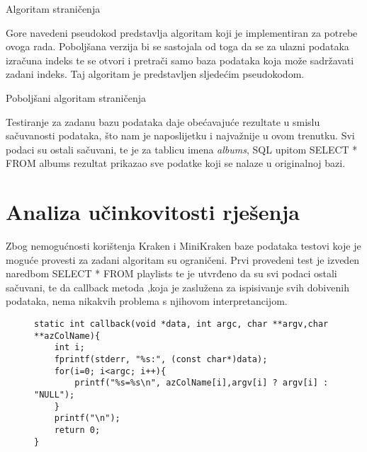 \documentclass[times, utf8, zavrsni]{fer}
\begin{document}
	\begin{algorithm}[H]
		\caption{Algoritam straničenja}
		\label{Stranicenje}
	\end{algorithm}

Gore navedeni pseudokod predstavlja algoritam koji je implementiran za potrebe ovoga rada. Poboljšana verzija bi se sastojala od toga da se za ulazni podataka izračuna indeks te se otvori i pretrači samo baza podataka koja može sadržavati zadani indeks. Taj algoritam je predstavljen sljedećim pseudokodom.
\newline
	\begin{algorithm}[H]
		\caption{Poboljšani algoritam straničenja}
		\label{Stranicenje2}
	\end{algorithm}

Testiranje za zadanu bazu podataka daje obećavajuće rezultate u smislu sačuvanosti podataka, što nam je naposlijetku i najvažnije u ovom trenutku. Svi podaci su ostali sačuvani, te je za tablicu imena \textit{albums}, SQL upitom SELECT * FROM albums rezultat prikazao sve podatke koji se nalaze u originalnoj bazi.
\chapter{Analiza učinkovitosti rješenja}
Zbog nemogućnosti korištenja Kraken i MiniKraken baze podataka testovi koje je moguće provesti za zadani algoritam su ograničeni. Prvi provedeni test je izveden naredbom SELECT * FROM playlists te je utvrđeno da su svi podaci ostali sačuvani, te da callback metoda ,koja je zaslužena za ispisivanje svih dobivenih podataka, nema nikakvih problema s njihovom interpretancijom. 
\newline
\begin{figure}[hbp]
	\begin{lstlisting}
static int callback(void *data, int argc, char **argv,char **azColName){
	int i;
	fprintf(stderr, "%s:", (const char*)data);
	for(i=0; i<argc; i++){
		printf("%s=%s\n", azColName[i],argv[i] ? argv[i] : "NULL");
	}
	printf("\n");
	return 0;
}
	\end{lstlisting}
\end{figure}
\end{document}
